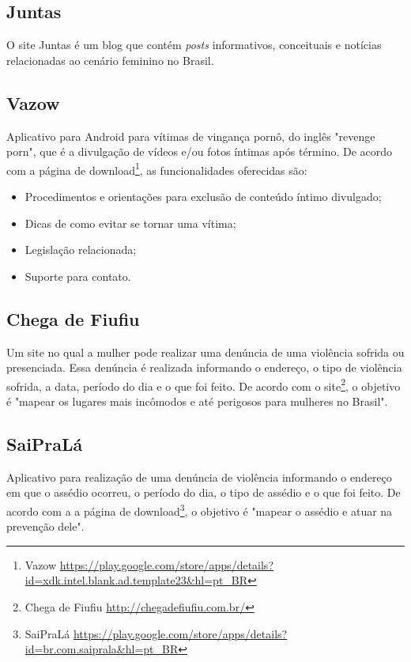 \subsection*{Juntas}
O site Juntas é um blog que contém \textit{posts} informativos, conceituais e notícias 
relacionadas ao cenário feminino no Brasil.

\subsection*{Vazow}

Aplicativo para Android para vítimas de vingança pornô, do inglês "revenge porn", que é a 
divulgação de vídeos e/ou fotos íntimas após término.
De acordo com a página de download\footnote{Vazow \url{https://play.google.com/store/apps/details?id=xdk.intel.blank.ad.template23&hl=pt_BR}}, as funcionalidades oferecidas são:

\begin{itemize}
	\item Procedimentos e orientações para exclusão de conteúdo íntimo divulgado;
	\item Dicas de como evitar se tornar uma vítima;
	\item Legislação relacionada;
	\item Suporte para contato.
\end{itemize}

\subsection*{Chega de Fiufiu}

Um site no qual a mulher pode realizar uma denúncia de uma violência sofrida ou presenciada. 
Essa denúncia é realizada informando o endereço, o tipo de violência sofrida, a data, período do dia e o que foi feito. De acordo com o site\footnote{Chega de Fiufiu \url{http://chegadefiufiu.com.br/}}, o objetivo é "mapear os lugares mais incômodos e até perigosos para mulheres no Brasil".

\subsection*{SaiPraLá}

Aplicativo para realização de uma denúncia de violência informando o endereço em que o assédio ocorreu, o período do dia, o tipo de assédio e o que foi feito. De acordo com a a página de download\footnote{SaiPraLá \url{https://play.google.com/store/apps/details?id=br.com.saiprala&hl=pt_BR}}, o objetivo é "mapear o assédio e atuar na prevenção dele".

